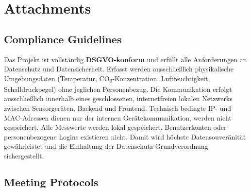 \documentclass{article}
\begin{document}
\section{Attachments}
\subsection{Compliance Guidelines}

Das Projekt ist vollständig \textbf{DSGVO-konform} und erfüllt alle Anforderungen an Datenschutz und Datensicherheit. 
Erfasst werden ausschließlich physikalische Umgebungsdaten (Temperatur, CO\textsubscript{2}-Konzentration, Luftfeuchtigkeit, Schalldruckpegel) ohne jeglichen Personenbezug. 
Die Kommunikation erfolgt ausschließlich innerhalb eines geschlossenen, internetfreien lokalen Netzwerks zwischen Sensorgeräten, Backend und Frontend. 
Technisch bedingte IP- und MAC-Adressen dienen nur der internen Gerätekommunikation, werden nicht gespeichert. 
Alle Messwerte werden lokal gespeichert, Benutzerkonten oder personenbezogene Logins existieren nicht. 
Damit wird höchste Datensouveränität gewährleistet und die Einhaltung der Datenschutz-Grundverordnung sichergestellt.






\subsection{Meeting Protocols}
\end{document}
